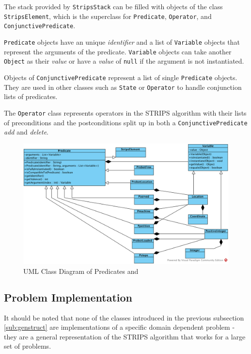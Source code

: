 The stack provided by \texttt{StripsStack} can be filled with objects of the class \texttt{StripsElement}, which is the superclass for \texttt{Predicate}, \texttt{Operator}, and \texttt{ConjunctivePredicate}. 

\texttt{Predicate} objects have an unique \textit{identifier} and a list of \texttt{Variable} objects that represent the arguments of the predicate. \texttt{Variable} objects can take another \texttt{Object} as their \textit{value} or have a \textit{value} of \texttt{null} if the argument is not instantiated. 

Objects of \texttt{ConjunctivePredicate} represent a list of single \texttt{Predicate} objects. They are used in other classes such as \texttt{State} or \texttt{Operator} to handle conjunction lists of predicates.

The \texttt{Operator} class represents operators in the STRIPS algorithm with their lists of preconditions and the postconditions split up in both a \texttt{ConjunctivePredicate} \textit{add} and \textit{delete}.

\begin{figure}[hbt]
  \includegraphics[width=1.1\textwidth]{uml/CD2}
  \caption{UML Class Diagram of Predicates and }
  \label{fig:uml1}
\end{figure}


\subsection{Problem Implementation}

It should be noted that none of the classes introduced in the previous subsection \ref{sub:genstruct} are implementations of a specific domain dependent problem - they are a general representation of the STRIPS algorithm that works for a large set of problems.

